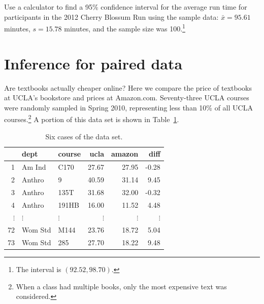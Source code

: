 \begin{exercise}
Use a calculator to find a 95\% confidence interval for the average run time for participants in the 2012 Cherry Blossum Run using the sample data: $\bar{x} = 95.61$ minutes, $s = 15.78$ minutes, and the sample size was 100.\footnote{The interval is $(92.52, 98.70)$.}
\end{exercise}



\textA{\newpage}

\section[Inference for paired data]{Inference for paired data }

\label{pairedData}



Are textbooks actually cheaper online? Here we compare the price of textbooks at UCLA's bookstore and prices at Amazon.com. Seventy-three UCLA courses were randomly sampled in Spring 2010, representing less than 10\% of all UCLA courses.\footnote{When a class had multiple books, only the most expensive text was considered.} A portion of this data set is shown in Table~\ref{textbooksDF}.

\begin{table}[h]
\centering
\begin{tabular}{rllrrr}
  \hline
 & dept & course & ucla & amazon & diff \\
  \hline
1 & Am Ind &  C170 & 27.67 & 27.95 & -0.28 \\
  2 & Anthro & 9 & 40.59 & 31.14 & 9.45 \\
  3 & Anthro & 135T & 31.68 & 32.00 & -0.32 \\
  4 & Anthro & 191HB & 16.00 & 11.52 & 4.48 \\
$\vdots$ & $\vdots$ & $\vdots$ & $\vdots$ & $\vdots$ & $\vdots$ \\
  72 & Wom Std & M144 & 23.76 & 18.72 & 5.04 \\
  73 & Wom Std & 285 & 27.70 & 18.22 & 9.48 \\
   \hline
\end{tabular}
\caption{Six cases of the  data set.}
\label{textbooksDF}
\end{table}

